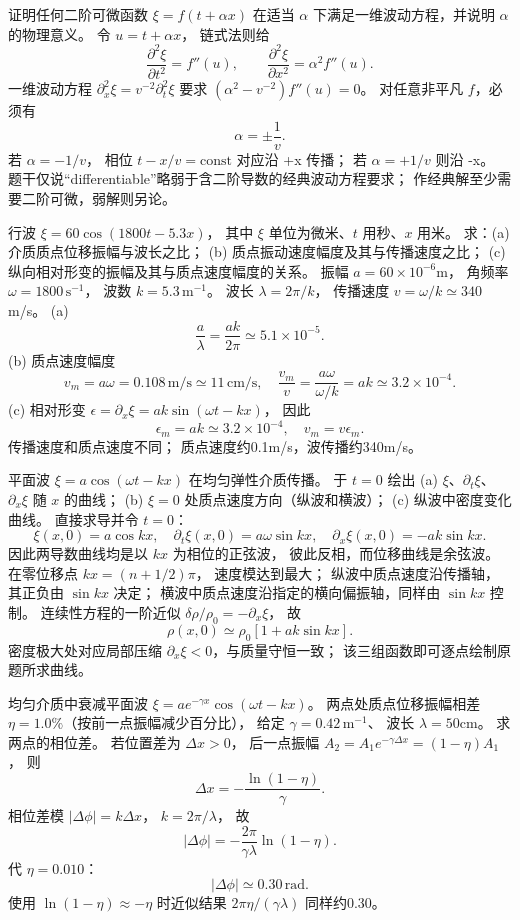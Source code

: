 证明任何二阶可微函数
$\xi=f(t+\alpha x)$
在适当 $\alpha$ 下满足一维波动方程，并说明 $\alpha$ 的物理意义。
\exsolution
令 $u=t+\alpha x$，
链式法则给
\[
\frac{\partial^2\xi}{\partial t^2}=f''(u),
\qquad
\frac{\partial^2\xi}{\partial x^2}=\alpha^2f''(u).
\]
一维波动方程
$\partial_x^2\xi=v^{-2}\partial_t^2\xi$
要求
$(\alpha^2-v^{-2})f''(u)=0$。
对任意非平凡 $f$，必须有
\[
\boxed{\alpha=\pm\frac1v}.
\]
若 $\alpha=-1/v$，
相位 $t-x/v=\text{const}$ 对应沿 +x 传播；
若 $\alpha=+1/v$ 则沿 -x。
\excheck 题干仅说“differentiable”略弱于含二阶导数的经典波动方程要求；
作经典解至少需要二阶可微，弱解则另论。

行波
$\xi=60\cos(1800t-5.3x)$，
其中 $\xi$ 单位为微米、$t$ 用秒、$x$ 用米。
求：(a) 介质质点位移振幅与波长之比；
(b) 质点振动速度幅度及其与传播速度之比；
(c) 纵向相对形变的振幅及其与质点速度幅度的关系。
\exsolution
振幅 $a=60\times10^{-6}$m，
角频率 $\omega=1800\,\mathrm{s^{-1}}$，
波数 $k=5.3\,\mathrm{m^{-1}}$。
波长 $\lambda=2\pi/k$，
传播速度 $v=\omega/k\simeq340$m/s。
(a)
\[
\boxed{\frac a\lambda=\frac{ak}{2\pi}
\simeq5.1\times10^{-5}}.
\]
(b) 质点速度幅度
\[
\boxed{v_m=a\omega=0.108\,\mathrm{m/s}
\simeq11\,\mathrm{cm/s}},
\quad
\boxed{\frac{v_m}{v}=\frac{a\omega}{\omega/k}
=ak\simeq3.2\times10^{-4}}.
\]
(c) 相对形变
$\epsilon=\partial_x\xi
=ak\sin(\omega t-kx)$，
因此
\[
\boxed{\epsilon_m=ak\simeq3.2\times10^{-4}},
\quad
\boxed{v_m=v\epsilon_m}.
\]
\excheck 传播速度和质点速度不同；
质点速度约0.1m/s，波传播约340m/s。

平面波
$\xi=a\cos(\omega t-kx)$
在均匀弹性介质传播。
于 $t=0$ 绘出
(a) $\xi$、$\partial_t\xi$、$\partial_x\xi$ 随 $x$ 的曲线；
(b) $\xi=0$ 处质点速度方向（纵波和横波）；
(c) 纵波中密度变化曲线。
\exsolution
直接求导并令 $t=0$：
\[
\boxed{\xi(x,0)=a\cos kx},\quad
\boxed{\partial_t\xi(x,0)=a\omega\sin kx},\quad
\boxed{\partial_x\xi(x,0)=-ak\sin kx}.
\]
因此两导数曲线均是以 $kx$ 为相位的正弦波，
彼此反相，而位移曲线是余弦波。
在零位移点 $kx=(n+1/2)\pi$，
速度模达到最大；
纵波中质点速度沿传播轴，其正负由
$\sin kx$ 决定；
横波中质点速度沿指定的横向偏振轴，同样由
$\sin kx$ 控制。
连续性方程的一阶近似
$\delta\rho/\rho_0=-\partial_x\xi$，
故
\[
\boxed{\rho(x,0)\simeq
\rho_0[1+ak\sin kx]}.
\]
\excheck 密度极大处对应局部压缩
$\partial_x\xi<0$，与质量守恒一致；
该三组函数即可逐点绘制原题所求曲线。

均匀介质中衰减平面波
$\xi=ae^{-\gamma x}\cos(\omega t-kx)$。
两点处质点位移振幅相差
$\eta=1.0\%$（按前一点振幅减少百分比），
给定 $\gamma=0.42\,\mathrm{m^{-1}}$、
波长 $\lambda=50$cm。
求两点的相位差。
\exsolution
若位置差为 $\Delta x>0$，
后一点振幅
$A_2=A_1e^{-\gamma\Delta x}
=(1-\eta)A_1$，
则
\[
\Delta x=-\frac{\ln(1-\eta)}{\gamma}.
\]
相位差模
$|\Delta\phi|=k\Delta x$，
$k=2\pi/\lambda$，
故
\[
\boxed{|\Delta\phi|=
-\frac{2\pi}{\gamma\lambda}\ln(1-\eta)}.
\]
代 $\eta=0.010$：
\[
\boxed{|\Delta\phi|\simeq0.30\,\mathrm{rad}}.
\]
\excheck 使用 $\ln(1-\eta)\approx-\eta$ 时近似结果
$2\pi\eta/(\gamma\lambda)$ 同样约0.30。

